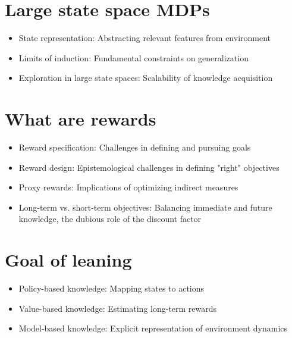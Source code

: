 \section{Large state space MDPs}

\begin{itemize}
    \item State representation: Abstracting relevant features from environment
    \item Limits of induction: Fundamental constraints on generalization
    \item Exploration in large state spaces: Scalability of knowledge acquisition
\end{itemize}


\section{What are rewards}
\begin{itemize}
    \item Reward specification: Challenges in defining and pursuing goals
    \item Reward design: Epistemological challenges in defining "right" objectives
    \item Proxy rewards: Implications of optimizing indirect measures
    \item Long-term vs. short-term objectives: Balancing immediate and future knowledge, the dubious role of the discount factor
\end{itemize}


\section{Goal of leaning}

\begin{itemize}
    \item Policy-based knowledge: Mapping states to actions
    \item Value-based knowledge: Estimating long-term rewards
    \item Model-based knowledge: Explicit representation of environment dynamics
\end{itemize}



